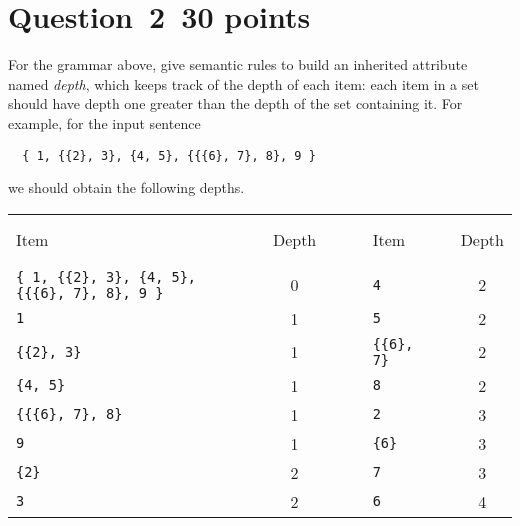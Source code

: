 \documentclass[10pt]{article}
\begin{document}
\section*{Question~2~\hfill 30 points}
For the grammar above, give semantic rules to build
an inherited attribute named \emph{depth},
which keeps track of the depth of each item:
each item in a set should have depth one greater
than the depth of the set containing it.
For example, for the input sentence
\begin{verbatim}
  { 1, {{2}, 3}, {4, 5}, {{{6}, 7}, 8}, 9 }
\end{verbatim}
we should obtain the following depths.
\begin{center}
\begin{tabular}{lrcrlrc}
  Item & & Depth & ~ ~ ~ & Item & & Depth \\
  \cline{1-1} \cline{3-3} \cline{5-5} \cline{7-7}
  \verb|{ 1, {{2}, 3}, {4, 5}, {{{6}, 7}, 8}, 9 }| && 0
  && \verb|4| && 2 \\
  \verb|1|  && 1
  && \verb|5| && 2 \\
  \verb|{{2}, 3}| && 1
  && \verb|{{6}, 7}| && 2 \\
  \verb|{4, 5}| && 1
  && \verb|8| && 2 \\
  \verb|{{{6}, 7}, 8}| && 1
  && \verb|2| && 3 \\
  \verb|9| && 1
  && \verb|{6}| && 3 \\
  \verb|{2}| && 2
  && \verb|7| && 3 \\
  \verb|3| && 2
  && \verb|6| && 4
\end{tabular}
\end{center}
\end{document}

